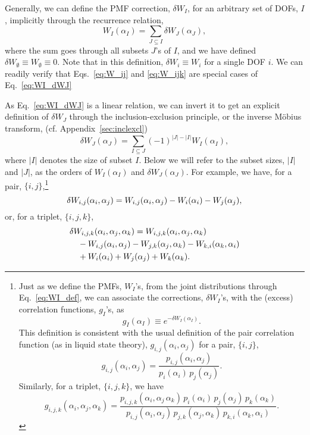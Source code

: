 \documentclass[reprint, superscriptaddress]{revtex4-1}
\begin{document}
Generally, we can define the PMF correction, $\delta W_I$,
for an arbitrary set of DOFs, $I$,
implicitly through the recurrence relation,
%
\begin{equation}
  W_I(\alpha_I)
  =
  \sum_{J \subseteq I}
  \delta W_J(\alpha_J)
  ,
  \label{eq:WI_dWJ}
\end{equation}
%
where the sum goes through all subsets $J$'s of $I$,
and we have defined
$\delta W_\emptyset \equiv W_\emptyset \equiv 0$.
%
Note that in this definition,
$\delta W_i \equiv W_i$
for a single DOF $i$.
%
We can readily verify that
Eqs.~\eqref{eq:W_ij} and \eqref{eq:W_ijk}
are special cases of Eq.~\eqref{eq:WI_dWJ}

As Eq.~\eqref{eq:WI_dWJ} is a linear relation,
we can invert it to get an explicit definition of $\delta W_J$
through the inclusion-exclusion principle,
or the inverse M\"{o}bius transform\cite{bjorklund2007},
(cf. Appendix~\ref{sec:inclexcl})
%
\begin{equation}
  \delta W_J(\alpha_J)
  =
  \sum_{I \subseteq J}
  (-1)^{|J| - |I|}
  W_I(\alpha_I)
  ,
  \label{eq:dWJ_WI}
\end{equation}
%
where $|I|$ denotes the size of subset $I$.
%
Below we will refer to the subset sizes, $|I|$ and $|J|$,
as the orders of $W_I(\alpha_I)$ and $\delta W_J(\alpha_J)$.
%
For example, we have, for a pair, $\{i, j\}$,\footnote{
  Just as we define the PMFs, $W_I$'s, from the joint distributions
  through Eq.~\eqref{eq:WI_def},
  we can associate the corrections, $\delta W_I$'s,
  with the (excess) correlation functions, $g_I$'s, as
  $$
  g_I(\alpha_I) \equiv e^{-\delta W_I(\alpha_I)}
  .
  $$
  This definition is consistent with the usual definition
  of the pair correlation function (as in liquid state theory\cite{hansen}),
  $g_{i,j}(\alpha_i, \alpha_j)$ for a pair, $\{i, j\}$,
  $$
    g_{i,j}(\alpha_i, \alpha_j)
    =
    \frac{ p_{i,j}(\alpha_i, \alpha_j) } { p_i(\alpha_i) \, p_j(\alpha_j) }
    .
  $$
  Similarly, for a triplet, $\{i, j, k\}$, we have
  $$
  g_{i,j,k}(\alpha_i, \alpha_j, \alpha_k)
  =
  \frac{ p_{i,j,k}(\alpha_i, \alpha_j \, \alpha_k) \, p_i(\alpha_i) \, p_j(\alpha_j) \, p_k(\alpha_k) }{ p_{i,j}(\alpha_i, \alpha_j) \, p_{j,k}(\alpha_j, \alpha_k) \, p_{k,i}(\alpha_k, \alpha_i) }
  .
  $$
}
%
\begin{equation}
  \delta W_{i,j}(\alpha_i, \alpha_j)
  =
  W_{i,j}(\alpha_i, \alpha_j)
  - W_{i}(\alpha_i) - W_{j}(\alpha_j)
  ,
  \notag
\end{equation}
%
or, for a triplet, $\{i, j, k\}$,
%
\begin{align*}
  &\delta W_{i,j,k}(\alpha_i, \alpha_j, \alpha_k)
  =
  W_{i,j,k}(\alpha_i, \alpha_j, \alpha_k)
  \notag\\
  &\quad
  - W_{i,j}(\alpha_i, \alpha_j)
  - W_{j,k}(\alpha_j, \alpha_k)
  - W_{k,i}(\alpha_k, \alpha_i)
  \notag\\
  &\quad
  + W_i(\alpha_i)
  + W_j(\alpha_j)
  + W_k(\alpha_k)
  .
\end{align*}
\end{document}
